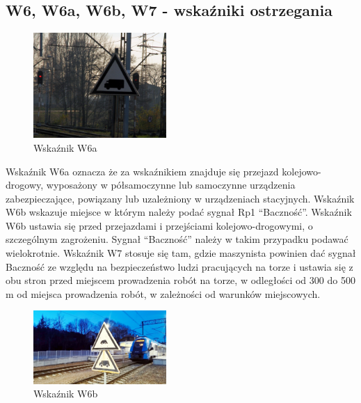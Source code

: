 \subsection{W6, W6a, W6b, W7 - wskaźniki ostrzegania}
	\begin{figure}
	\includegraphics[width=0.45\textwidth]{skryptkierownik-img/skryptkierownik-img010.jpg}
	\caption{Wskaźnik W6a}
\end{figure}
\begin{tcolorbox}[colback=black!5!white,colframe=white!55!black,title=Wskaźnik W6]
Wskaźnik W6a oznacza że za wskaźnikiem znajduje się przejazd kolejowo-drogowy, wyposażony w półsamoczynne lub samoczynne urządzenia zabezpieczające, powiązany lub uzależniony w urządzeniach stacyjnych.
Wskaźnik W6b wskazuje miejsce w którym należy podać sygnał Rp1 “Baczność”. Wskaźnik W6b ustawia się przed przejazdami i przejściami kolejowo-drogowymi, o szczególnym zagrożeniu. Sygnał “Baczność” należy w takim przypadku podawać wielokrotnie. Wskaźnik W7 stosuje się tam, gdzie maszynista powinien dać sygnał {\textquotedbl}Baczność{\textquotedbl} ze względu na bezpieczeństwo ludzi pracujących na torze i ustawia się z obu stron przed miejscem prowadzenia robót na torze, w odległości od 300 do 500 m od miejsca prowadzenia robót, w zależności od warunków miejscowych.
\end{tcolorbox}
	\begin{figure}
		\includegraphics[width=0.45\textwidth]{skryptkierownik-img/wskaznik-w6b.jpg}
		\caption{Wskaźnik W6b}
	\end{figure}

